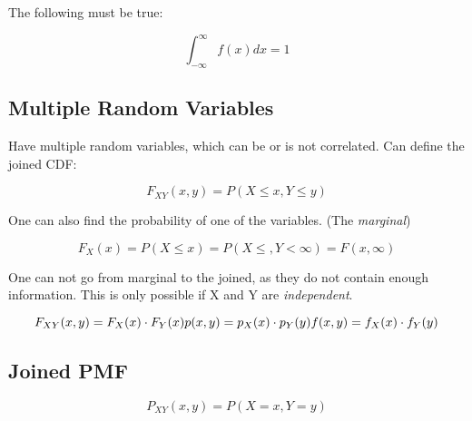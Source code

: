 The following must be true:

$$
\int_{-\infty}^{\infty} f(x) dx = 1
$$

\subsection{Multiple Random Variables}

Have multiple random variables, which can be or is not correlated.
Can define the joined CDF:

$$
F_{XY}(x,y) = P(X \leq x, Y \leq y)
$$

One can also find the probability of one of the variables. (The \emph{marginal})

$$
F_X(x) = P(X \leq x) = P(X \leq, Y < \infty) = F(x, \infty)
$$

One can not go from marginal to the joined, as they do not contain enough information.
This is only possible if X and Y are \emph{independent}.

$$
F_{XY}(x,y) = F_X(x) \cdot F_Y(x) \\
p(x,y) = p_X(x) \cdot p_Y(y) \\
f(x,y) = f_X(x) \cdot f_Y(y)
$$

\subsection{Joined PMF}

$$
P_{XY}(x,y) = P(X = x, Y = y)
$$


